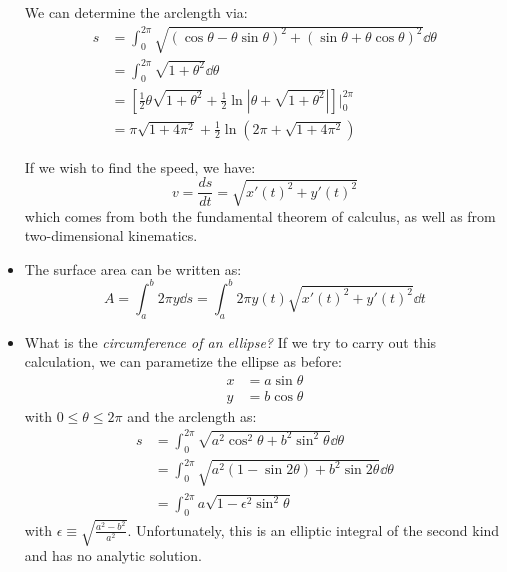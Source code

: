 \begin{itemize}
\begin{example}
        \begin{center}
        \end{center}
        We can determine the arclength via:
        \begin{align}
            s &= \int_0^{2\pi} \sqrt{(\cos\theta-\theta \sin\theta)^2 + (\sin\theta+\theta\cos\theta)^2} \dd{\theta} \\ 
            &= \int_0^{2\pi} \sqrt{1+\theta^2}\dd{\theta} \\ 
            &= \left[\frac{1}{2}\theta\sqrt{1+\theta^2}+\frac{1}{2}\ln\left|\theta+\sqrt{1+\theta^2}\right|\right]\Biggr|^{2\pi}_0 \\ 
            &= \pi\sqrt{1+4\pi^2} + \frac{1}{2}\ln\left(2\pi + \sqrt{1+4\pi^2}\right)
        \end{align}
    \end{example}
    \begin{idea}
        If we wish to find the speed, we have:
        \begin{equation}
            v = \frac{ds}{dt} = \sqrt{x'(t)^2+y'(t)^2}
        \end{equation}
        which comes from both the fundamental theorem of calculus, as well as from two-dimensional kinematics.
    \end{idea}
    \item The surface area can be written as:
    \begin{equation}
        A = \int_a^b 2\pi y \dd{s} = \int_a^b 2\pi y(t) \sqrt{x'(t)^2+y'(t)^2} \dd{t}
    \end{equation}
    \item What is the \textit{circumference of an ellipse?} If we try to carry out this calculation, we can parametize the ellipse as before:
    \begin{align}
        x &= a\sin\theta \\ 
        y &= b\cos\theta 
    \end{align}
    with $0 \le \theta \le 2\pi$ and the arclength as:
    \begin{align}
        s &= \int_0^{2\pi} \sqrt{a^2\cos^2\theta + b^2\sin^2\theta} \dd{\theta} \\ 
        &= \int_0^{2\pi} \sqrt{a^2(1-\sin 2\theta) + b^2\sin 2\theta} \dd{\theta} \\ 
        &= \int_0^{2\pi} a\sqrt{1- \epsilon^2 \sin^2\theta}
    \end{align}
    with $\epsilon \equiv \sqrt{\frac{a^2-b^2}{a^2}}$. Unfortunately, this is an elliptic integral of the second kind and has no analytic solution.
\end{itemize}